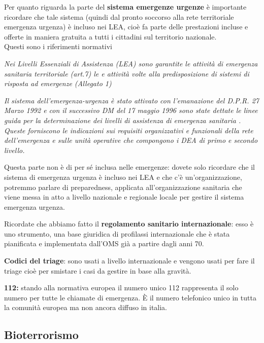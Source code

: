 Per quanto riguarda la parte del \textbf{sistema emergenze urgenze} è
importante ricordare che tale sistema (quindi dal pronto soccorso alla
rete territoriale emergenza urgenza) è incluso nei LEA, cioè fa parte
delle prestazioni incluse e offerte in maniera gratuita a tutti i
cittadini sul territorio nazionale.\\
Questi sono i riferimenti normativi

\emph{Nei Livelli Essenziali di Assistenza (LEA) sono garantite le
attività di emergenza sanitaria territoriale (art.7) le e attività volte
alla predisposizione di sistemi di risposta ad emergenze (Allegato 1)}

\emph{Il sistema dell'emergenza-urgenza è stato attivato con
l'emanazione del D.P.R. 27 Marzo 1992 e con il successivo DM del 17
maggio 1996 sono state dettate le linee guida per la determinazione dei
livelli di assistenza di emergenza sanitaria . Queste forniscono le
indicazioni sui requisiti organizzativi e funzionali della rete
dell'emergenza e sulle unità operative che compongono i DEA di primo e
secondo livello.}

Questa parte non è di per sé inclusa nelle emergenze: dovete solo
ricordare che il sistema di emergenza urgenza è incluso nei LEA e che
c'è un'organizzazione, potremmo parlare di preparedness, applicata
all'organizzazione sanitaria che viene messa in atto a livello nazionale
e regionale locale per gestire il sistema emergenza urgenza.

Ricordate che abbiamo fatto il \textbf{regolamento sanitario
internazionale}: esso è uno strumento, una base giuridica di profilassi
internazionale che è stata pianificata e implementata dall'OMS già a
partire dagli anni 70.

\textbf{Codici del triage}: sono usati a livello internazionale e
vengono usati per fare il triage cioè per smistare i casi da gestire in
base alla gravità.

\textbf{112:} stando alla normativa europea il numero unico 112
rappresenta il solo numero per tutte le chiamate di emergenza. È il
numero telefonico unico in tutta la comunità europea ma non ancora
diffuso in italia.

\subsection{Bioterrorismo}

